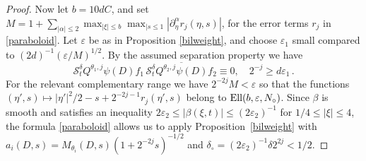 \documentclass[11pt]{amsart}
\theoremstyle{definition}
\numberwithin{theorem}{section}
\numberwithin{definition}{section}
\def\Ellip{\text{{\rm Ell}}}
\def\prodstar{{\prod_{i=1,2}}^{\!\!*}}
\newcommand{\note}[1]{\footnote{\texttt{\Small #1}}}
\def\eps{\varepsilon}
\def\cS{{\mathcal {S}}}
\begin{document}
\begin{proof}
Now let $b=10d C$, and set
$M= 1+\sum_{|\alpha|\le 2}\max_{|\xi|\le b}
\max_{|s\le 1}|\partial_\eta^\alpha r_j(\eta,s)|$,
for the error terms $r_j$ in
\eqref{paraboloid}. Let
$\eps$ be as   in Proposition \ref{bilweight},
 and choose $\eps_1$ small compared to $(2d)^{-1} (\eps/M)^{1/2}$.
By the assumed separation property we have
$$\cS_t^\delta  Q^{\theta_1,j} \psi (D)f_1\,
\overline{\cS_t^\delta  Q^{\theta_2,j} \psi(D)f_2}\equiv 0,\quad 2^{-j}\ge d\eps_1\,.$$
For the relevant complementary range we have $2^{-2j}M <\eps$ so that
the functions
$(\eta',s)\mapsto |\eta'|^2/2 -s +2^{-2j-1} r_j(\eta',s)$ belong to
$\Ellip(b,\eps, N_\circ)$.
Since $\beta$ is smooth and satisfies an inequality $2\eps_2\le |\beta(\xi,t)|\le (2\eps_2)^{-1}$ for $1/4\le |\xi|\le 4$,
the formula \eqref{paraboloid} allows us
to apply Proposition~\ref{bilweight} with $a_i(D,s)= M_{\theta_i}(D,s)
(1+2^{-2j} s)^{-1/2}$ and
 $\delta_\circ= (2\eps_2)^{-1} \delta 2^{2j}<1/2$.



\end{proof}
\end{document}
